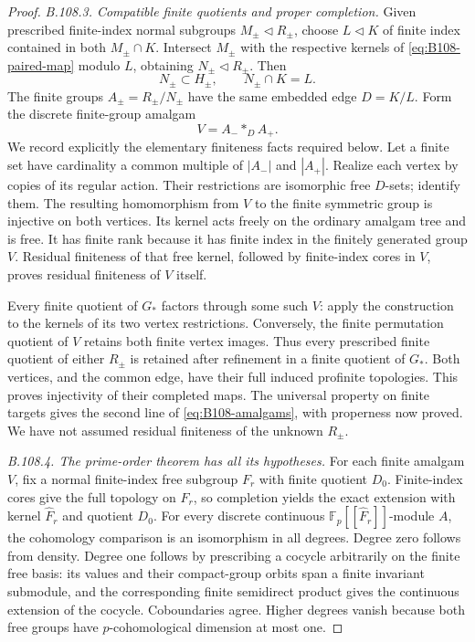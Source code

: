 \begin{proof}
\emph{B.108.3. Compatible finite quotients and proper completion.}
Given prescribed finite-index normal subgroups
$M_\pm\triangleleft R_\pm$, choose
$L\triangleleft K$ of finite index contained in both
$M_\pm\cap K$. Intersect $M_\pm$ with the respective kernels
of \eqref{eq:B108-paired-map} modulo $L$, obtaining
$N_\pm\triangleleft R_\pm$. Then
\[
 N_\pm\subset H_\pm,\qquad N_\pm\cap K=L.
\]
The finite groups $A_\pm=R_\pm/N_\pm$ have the same embedded
edge $D=K/L$. Form the discrete finite-group amalgam
\[
 V=A_-*_{D}A_+.
\]
We record explicitly the elementary finiteness facts required
below. Let a finite set have cardinality a common multiple of
$|A_-|$ and $|A_+|$. Realize each vertex by copies of its regular
action. Their restrictions are isomorphic free $D$-sets; identify
them. The resulting homomorphism from $V$ to the finite symmetric
group is injective on both vertices. Its kernel acts freely on
the ordinary amalgam tree and is free. It has finite rank because
it has finite index in the finitely generated group $V$.
Residual finiteness of that free kernel, followed by finite-index
cores in $V$, proves residual finiteness of $V$ itself.

Every finite quotient of $G_*$ factors through some such $V$:
apply the construction to the kernels of its two vertex
restrictions. Conversely, the finite permutation quotient of
$V$ retains both finite vertex images. Thus every prescribed
finite quotient of either $R_\pm$ is retained after refinement
in a finite quotient of $G_*$. Both vertices, and the common
edge, have their full induced profinite topologies. This proves
injectivity of their completed maps. The universal property on
finite targets gives the second line of
\eqref{eq:B108-amalgams}, with properness now proved. We have
not assumed residual finiteness of the unknown $R_\pm$.

\emph{B.108.4. The prime-order theorem has all its hypotheses.}
For each finite amalgam $V$, fix a normal finite-index free
subgroup $F_r$ with finite quotient $D_0$. Finite-index cores
give the full topology on $F_r$, so completion yields the exact
extension with kernel $\widehat F_r$ and quotient $D_0$.
For every discrete continuous
$\mathbb F_p[[\widehat F_r]]$-module $A$, the cohomology
comparison is an isomorphism in all degrees. Degree zero
follows from density. Degree one follows by prescribing a
cocycle arbitrarily on the finite free basis: its values and
their compact-group orbits span a finite invariant submodule,
and the corresponding finite semidirect product gives the
continuous extension of the cocycle. Coboundaries agree.
Higher degrees vanish because both free groups have
$p$-cohomological dimension at most one.


\end{proof}
